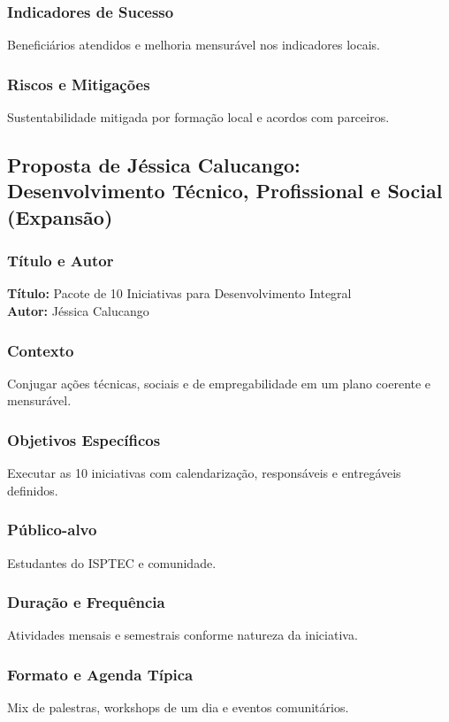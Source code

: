 \documentclass[12pt,a4paper]{article}
\begin{document}
\subsubsection*{Indicadores de Sucesso}
Beneficiários atendidos e melhoria mensurável nos indicadores locais.

\subsubsection*{Riscos e Mitigações}
Sustentabilidade mitigada por formação local e acordos com parceiros.

\subsection{Proposta de Jéssica Calucango: Desenvolvimento Técnico, Profissional e Social (Expansão)}

\subsubsection*{Título e Autor}
\textbf{Título:} Pacote de 10 Iniciativas para Desenvolvimento Integral \\
\textbf{Autor:} Jéssica Calucango

\subsubsection*{Contexto}
Conjugar ações técnicas, sociais e de empregabilidade em um plano coerente e mensurável.

\subsubsection*{Objetivos Específicos}
Executar as 10 iniciativas com calendarização, responsáveis e entregáveis definidos.

\subsubsection*{Público-alvo}
Estudantes do ISPTEC e comunidade.

\subsubsection*{Duração e Frequência}
Atividades mensais e semestrais conforme natureza da iniciativa.

\subsubsection*{Formato e Agenda Típica}
Mix de palestras, workshops de um dia e eventos comunitários.
\end{document}
